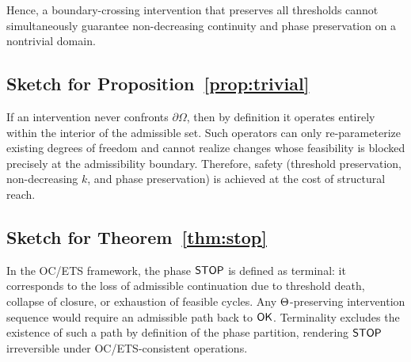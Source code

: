 Hence, a boundary-crossing intervention that preserves all thresholds cannot
simultaneously guarantee non-decreasing continuity and phase preservation on a
nontrivial domain.

\subsection{Sketch for Proposition~\ref{prop:trivial}}

If an intervention never confronts $\partial\Omega$, then by definition it
operates entirely within the interior of the admissible set.
Such operators can only re-parameterize existing degrees of freedom and cannot
realize changes whose feasibility is blocked precisely at the admissibility
boundary.
Therefore, safety (threshold preservation, non-decreasing $k$, and phase
preservation) is achieved at the cost of structural reach.

\subsection{Sketch for Theorem~\ref{thm:stop}}

In the OC/ETS framework, the phase $\mathsf{STOP}$ is defined as terminal: it corresponds
to the loss of admissible continuation due to threshold death, collapse of
closure, or exhaustion of feasible cycles.
Any $\Theta$-preserving intervention sequence would require an admissible
path back to $\mathsf{OK}$.
Terminality excludes the existence of such a path by definition of the phase
partition, rendering $\mathsf{STOP}$ irreversible under OC/ETS-consistent operations.
